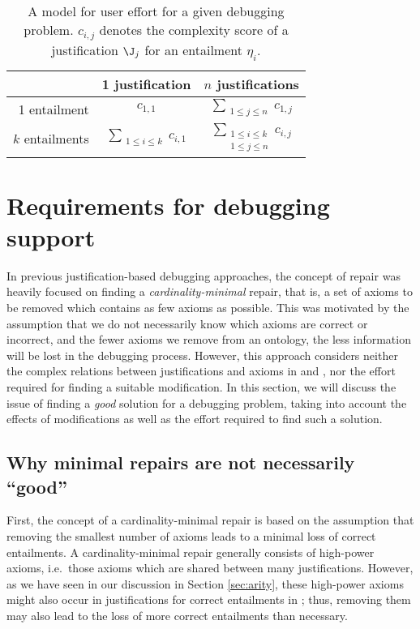 \begin{table}[bht]
\caption{A model for user effort for a given debugging problem. $c_{i,j}$ denotes the complexity score of a justification $\J_{j}$ for an entailment $\eta_{i}$.}\label{tab:effortmodel}
\centering 
\begin{tabu}{rcc}
\toprule 
 & 1 justification & $n$ justifications \\ 
 entailment & $c_{1,1}$ & $\sum\limits_{\substack{1\leq j\leq n}}  c_{1,j}$ \\ 
$k$ entailments & $\sum\limits_{\substack{1\leq i\leq k}} c_{i,1}$ & $\sum\limits_{\substack{
   1\leq i\leq k \\
   1\leq j \leq n
  }} c_{i,j}$ \\ 
\bottomrule 
\end{tabu} 
\end{table}









\section{Requirements for debugging support}

In previous justification-based debugging approaches, the concept of repair was heavily focused on finding a \emph{cardinality-minimal} repair, that is, a set of axioms \repair to be removed which contains as few axioms as possible. This was motivated by the assumption that we do not necessarily know which axioms are correct or incorrect, and the fewer axioms we remove from an ontology, the less information will be lost in the debugging process. However, this approach considers neither the complex relations between justifications and axioms in \entsetplus and \entsetminus, nor the effort required for finding a suitable modification. In this section, we will discuss the issue of finding a \emph{good} solution for a debugging problem, taking into account the effects of modifications as well as the effort required to find such a solution.

\subsection{Why minimal repairs are not necessarily \enquote{good}}
\label{sec:goodrepair}

First, the concept of a cardinality-minimal repair is based on the assumption that removing the smallest number of axioms leads to a minimal loss of correct entailments. A cardinality-minimal repair generally consists of high-power axioms, i.e.\ those axioms which are shared between many justifications. However, as we have seen in our discussion in Section \ref{sec:arity}, these high-power axioms might also occur in justifications for correct entailments in \entsetplus; thus, removing them may also lead to the loss of more correct entailments than necessary. 

